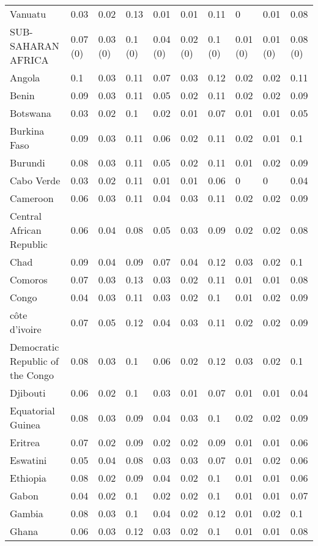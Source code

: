 \begin{longtable}[t]{llllllllll}
Vanuatu & 0.03 & 0.02 & 0.13 & 0.01 & 0.01 & 0.11 & 0 & 0.01 & 0.08\\
SUB-SAHARAN AFRICA & 0.07 (0) & 0.03 (0) & 0.1 (0) & 0.04 (0) & 0.02 (0) & 0.1 (0) & 0.01 (0) & 0.01 (0) & 0.08 (0)\\
Angola & 0.1 & 0.03 & 0.11 & 0.07 & 0.03 & 0.12 & 0.02 & 0.02 & 0.11\\
Benin & 0.09 & 0.03 & 0.11 & 0.05 & 0.02 & 0.11 & 0.02 & 0.02 & 0.09\\
Botswana & 0.03 & 0.02 & 0.1 & 0.02 & 0.01 & 0.07 & 0.01 & 0.01 & 0.05\\
Burkina Faso & 0.09 & 0.03 & 0.11 & 0.06 & 0.02 & 0.11 & 0.02 & 0.01 & 0.1\\
Burundi & 0.08 & 0.03 & 0.11 & 0.05 & 0.02 & 0.11 & 0.01 & 0.02 & 0.09\\
Cabo Verde & 0.03 & 0.02 & 0.11 & 0.01 & 0.01 & 0.06 & 0 & 0 & 0.04\\
Cameroon & 0.06 & 0.03 & 0.11 & 0.04 & 0.03 & 0.11 & 0.02 & 0.02 & 0.09\\
Central African Republic & 0.06 & 0.04 & 0.08 & 0.05 & 0.03 & 0.09 & 0.02 & 0.02 & 0.08\\
Chad & 0.09 & 0.04 & 0.09 & 0.07 & 0.04 & 0.12 & 0.03 & 0.02 & 0.1\\
Comoros & 0.07 & 0.03 & 0.13 & 0.03 & 0.02 & 0.11 & 0.01 & 0.01 & 0.08\\
Congo & 0.04 & 0.03 & 0.11 & 0.03 & 0.02 & 0.1 & 0.01 & 0.02 & 0.09\\
côte d'ivoire & 0.07 & 0.05 & 0.12 & 0.04 & 0.03 & 0.11 & 0.02 & 0.02 & 0.09\\
Democratic Republic of the Congo & 0.08 & 0.03 & 0.1 & 0.06 & 0.02 & 0.12 & 0.03 & 0.02 & 0.1\\
Djibouti & 0.06 & 0.02 & 0.1 & 0.03 & 0.01 & 0.07 & 0.01 & 0.01 & 0.04\\
Equatorial Guinea & 0.08 & 0.03 & 0.09 & 0.04 & 0.03 & 0.1 & 0.02 & 0.02 & 0.09\\
Eritrea & 0.07 & 0.02 & 0.09 & 0.02 & 0.02 & 0.09 & 0.01 & 0.01 & 0.06\\
Eswatini & 0.05 & 0.04 & 0.08 & 0.03 & 0.03 & 0.07 & 0.01 & 0.02 & 0.06\\
Ethiopia & 0.08 & 0.02 & 0.09 & 0.04 & 0.02 & 0.1 & 0.01 & 0.01 & 0.06\\
Gabon & 0.04 & 0.02 & 0.1 & 0.02 & 0.02 & 0.1 & 0.01 & 0.01 & 0.07\\
Gambia & 0.08 & 0.03 & 0.1 & 0.04 & 0.02 & 0.12 & 0.01 & 0.02 & 0.1\\
Ghana & 0.06 & 0.03 & 0.12 & 0.03 & 0.02 & 0.1 & 0.01 & 0.01 & 0.08\\

\end{longtable}
